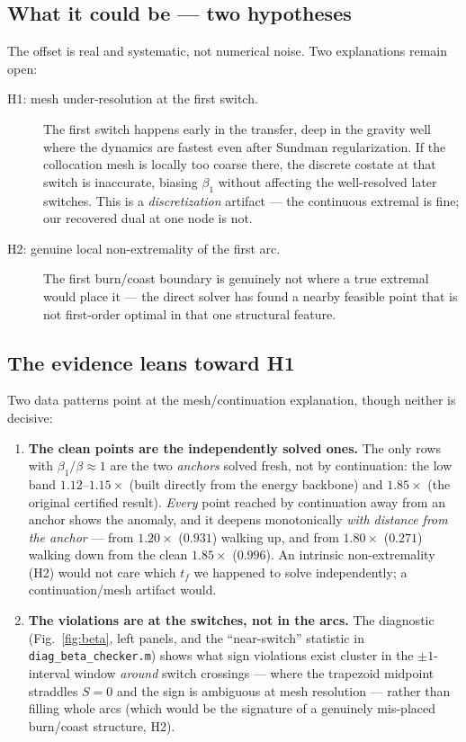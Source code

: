 \documentclass[11pt]{article}
\newcommand{\tf}{t_f}
\begin{document}
\subsection{What it could be --- two hypotheses}

The offset is real and systematic, not numerical noise. Two explanations remain
open:
\begin{description}
\item[H1: mesh under-resolution at the first switch.] The first switch happens
early in the transfer, deep in the gravity well where the dynamics are fastest
even after Sundman regularization. If the collocation mesh is locally too coarse
there, the discrete costate at that switch is inaccurate, biasing $\beta_1$
without affecting the well-resolved later switches. This is a
\emph{discretization} artifact --- the continuous extremal is fine; our
recovered dual at one node is not.
\item[H2: genuine local non-extremality of the first arc.] The first burn/coast
boundary is genuinely not where a true extremal would place it --- the direct
solver has found a nearby feasible point that is not first-order optimal in that
one structural feature.
\end{description}

\subsection{The evidence leans toward H1}

Two data patterns point at the mesh/continuation explanation, though neither is
decisive:

\begin{enumerate}
\item \textbf{The clean points are the independently solved ones.} The only
rows with $\beta_1/\beta\approx1$ are the two \emph{anchors} solved fresh, not by
continuation: the low band $1.12$--$1.15\times$ (built directly from the energy
backbone) and $1.85\times$ (the original certified result). \emph{Every} point
reached by continuation away from an anchor shows the anomaly, and it deepens
monotonically \emph{with distance from the anchor} --- from $1.20\times$
($0.931$) walking up, and from $1.80\times$ ($0.271$) walking down from the clean
$1.85\times$ ($0.996$). An intrinsic non-extremality (H2) would not care which
$\tf$ we happened to solve independently; a continuation/mesh artifact would.
\item \textbf{The violations are at the switches, not in the arcs.} The
diagnostic (Fig.~\ref{fig:beta}, left panels, and the ``near-switch'' statistic
in \texttt{diag\_beta\_checker.m}) shows what sign violations exist cluster in
the $\pm1$-interval window \emph{around} switch crossings --- where the
trapezoid midpoint straddles $S=0$ and the sign is ambiguous at mesh resolution
--- rather than filling whole arcs (which would be the signature of a genuinely
mis-placed burn/coast structure, H2).
\end{enumerate}
\end{document}
